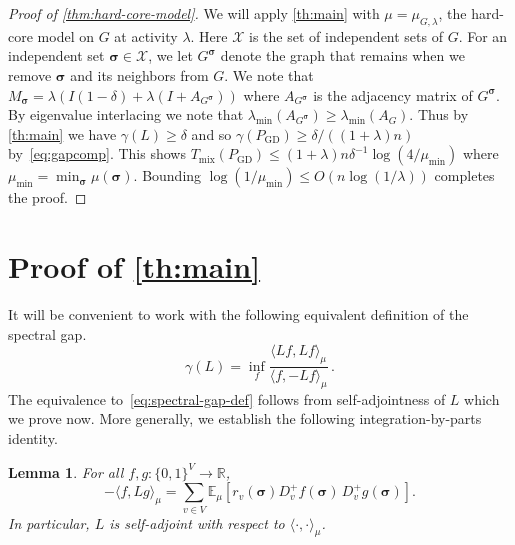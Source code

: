 \documentclass[10pt,a4paper]{amsart}
\newtheorem{lemma}[theorem]{Lemma}
\newcommand{\E}{\mathbb{E}}
\newcommand{\sigmabf}{ \boldsymbol{\sigma} }
\begin{document}
	\begin{proof}[Proof of \cref{thm:hard-core-model}]
		We will apply \cref{th:main} with $\mu=\mu_{G,\lambda}$, the hard-core model on $G$ at activity $\lambda$.  Here $\mathcal{X}$ is the set of independent sets of $G$.  For an independent set $\sigmabf \in \mathcal{X}$, we let $G^{\sigmabf}$ denote the graph that remains when we remove $\sigmabf$ and its neighbors from $G$.  We note that $M_{\sigmabf} = \lambda\left(I(1 - \delta) + \lambda(I + A_{G^{\sigmabf}}) \right)$ where $A_{G^{\sigmabf}}$ is the adjacency matrix of $G^{\sigmabf}$.  By eigenvalue interlacing we note that $\lambda_{\min}(A_{G^{\sigmabf}}) \geq \lambda_{\min}(A_G)$.  Thus by \cref{th:main} we have $\gamma(L) \geq \delta$ and so $\gamma(P_{\mathrm{GD}}) \geq \delta/((1+\lambda)n)$ by~\eqref{eq:gapcomp}. 
		This shows $T_{\mathrm{mix}}(P_{\mathrm{GD}}) \leq (1+\lambda)n\delta^{-1}\log\left(4/\mu_{\min}\right)$ where $\mu_{\min}=\min_{\sigmabf} \mu(\sigmabf)$.  Bounding $\log(1/\mu_{\min}) \leq O(n \log(1/\lambda))$ completes the proof.
	\end{proof}

	
	
	
	\section{Proof of \texorpdfstring{\cref{th:main}}{Theorem 1.2}}
	It will be convenient to work with the following equivalent definition of the spectral gap. 
	\[
	\gamma(L) = \inf_{f} \frac{\langle Lf,Lf\rangle_\mu}{\langle f, -Lf\rangle_\mu}\,.
	\]
	The equivalence to~\eqref{eq:spectral-gap-def} follows from self-adjointness of $L$ which we prove now. More generally, we establish the following integration-by-parts identity. 
	
	\begin{lemma}\label{lem:ibp}
		For all $f,g:\{0,1\}^V\to\mathbb R$,
		\begin{equation}\label{eq:ibp}
			-\langle f,Lg\rangle_\mu
			=
			\sum_{v\in V}\E_\mu\left[r_v(\sigmabf)D_v^+f(\sigmabf)\,D_v^+g(\sigmabf)
			\right].
		\end{equation}
		In particular, $L$ is self-adjoint with respect to $\langle \cdot,\cdot\rangle_\mu$.
	\end{lemma}
	
\end{document}
